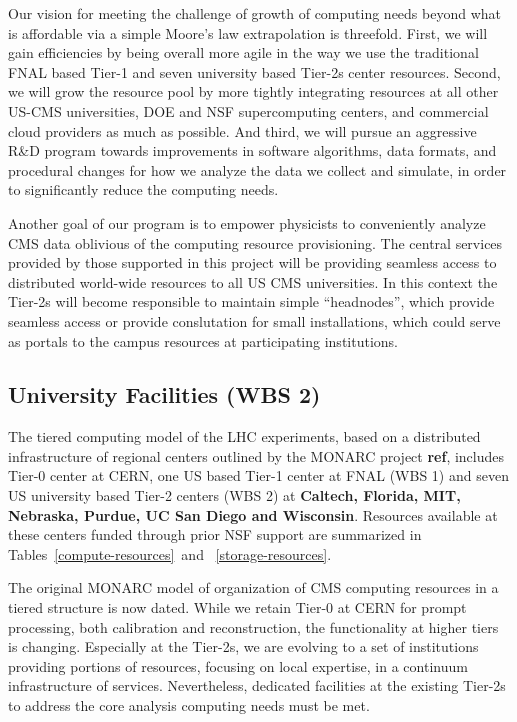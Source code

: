 \documentclass[11pt,a4paper]{article}
\begin{document}
Our vision for meeting the challenge of growth of computing needs
beyond what is affordable via a simple Moore's law extrapolation is
threefold. First, we will gain efficiencies by being overall more
agile in the way we use the traditional FNAL based Tier-1 and seven
university based Tier-2s center resources. Second, we will grow the
resource pool by more tightly integrating resources at all other
US-CMS universities, DOE and NSF supercomputing centers, and
commercial cloud providers as much as possible. And third, we will
pursue an aggressive R\&D program towards improvements in software
algorithms, data formats, and procedural changes for how we analyze
the data we collect and simulate, in order to significantly reduce the
computing needs.

Another goal of our program is to empower physicists to conveniently
analyze CMS data oblivious of the computing resource provisioning.
The central services provided by those supported in this project
will be providing seamless access to distributed world-wide 
resources to all US CMS universities.  In this context the 
Tier-2s will become responsible to maintain simple ``headnodes'',
which provide seamless access or provide conslutation for small 
installations, which could serve as portals to the campus
resources at participating institutions.  

\subsection{University Facilities (WBS 2)}

The tiered computing model of the LHC experiments, based on a 
distributed infrastructure of regional centers outlined by
the MONARC project {\bf ref}, includes Tier-0 center at CERN,
one US based Tier-1 center at FNAL (WBS 1) and seven US 
university based Tier-2 centers (WBS 2) at 
{\bf Caltech, Florida, MIT, Nebraska, Purdue, UC San Diego and Wisconsin}.
Resources available at these centers funded through prior NSF
support are summarized in Tables~\ref{compute-resources}~and~
\ref{storage-resources}.

The original MONARC model of organization of CMS computing resources
in a tiered structure is now dated. While we retain Tier-0 at CERN for
prompt processing, both calibration and reconstruction, the
functionality at higher tiers is changing. Especially at the Tier-2s,
we are evolving to a set of institutions providing portions of
resources, focusing on local expertise, in a continuum infrastructure
of services. Nevertheless, dedicated facilities at the existing
Tier-2s to address the core analysis computing needs must be met.
\end{document}
